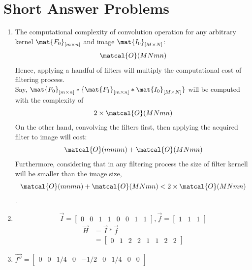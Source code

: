 \documentclass{article}
\begin{document}
\section{Short Answer Problems}
\begin{enumerate}
	\item The computational complexity of convolution operation for any arbitrary
	kernel $\mat{F_0}_{[m\times n]}$ and image $\mat{I_0}_{[M\times N]}$:
	$$\matcal{O}(MNmn)$$
	Hence, applying a handful of filters will multiply
	the computational cost of filtering process.\\
	Say, $\mat{F_0}_{[m\times n]} \ast \{\mat{F_1}_{[m\times n]} \ast
	\mat{I_0}_{[M\times N]}\}$ will be computed with the complexity of $$2 \times
	\matcal{O}(MNmn)$$
	On the other hand, convolving the filters first, then applying the
	acquired filter to image will cost: $$\matcal{O}(mnmn) + \matcal{O}(MNmn)$$
	Furthermore, considering that in any filtering process the size of filter
	kernell will be smaller than the image size, $$\matcal{O}(mnmn) + \matcal{O}(MNmn) < 2 \times \matcal{O}(MNmn)$$.
	\item 
	$$\vec{I} = \begin{bmatrix} 0 & 0 & 1 & 1 & 0 & 0 & 1 & 1\end{bmatrix}
	, \vec{f}= \begin{bmatrix} 1 & 1 & 1\end{bmatrix}$$
	\begin{equation} 
	\begin{split}
	\vec{H} & = \vec{I} \ast \vec{f} \\
	& = \begin{bmatrix} 0 & 1 & 2 & 2 & 1 & 1 & 2 & 2 \end{bmatrix}
	\end{split}
	\end{equation}
	\item $ \vec{f''} = \begin{bmatrix} 0 & 0 & 1/4 & 0 & -1/2 & 0 & 1/4 & 0 & 0
	\end{bmatrix}$

\end{enumerate}
\end{document}
